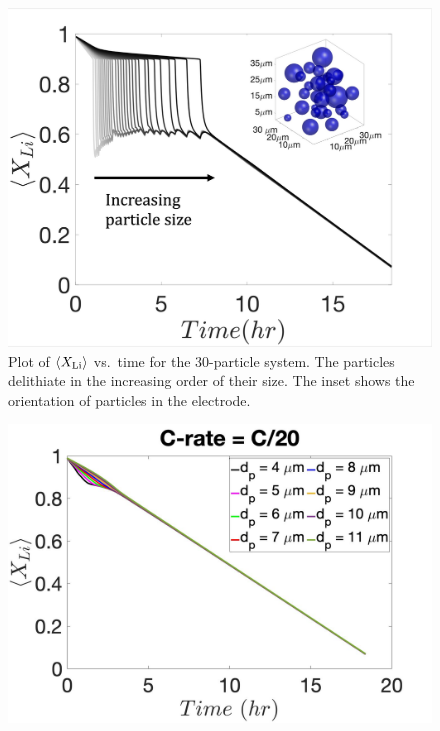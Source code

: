 \documentclass{article}
\newlength{\figwidth}
\begin{document}
\begin{figure}
  \includegraphics{figures/30_particles.png}
  \caption{Plot of $\left<X_{\rm{Li}}\right>$ vs.\ time for the
    30-particle system. The particles delithiate in the increasing
    order of their size. The inset shows the orientation of particles
    in the electrode.}
  \label{fig:30_particles}
\end{figure}

\begin{figure}
  \includegraphics[width=\figwidth]{figures/Ds_profiles.jpg}
  \caption{}
  \label{fig:Ds_profiles}
\end{figure}
\end{document}
